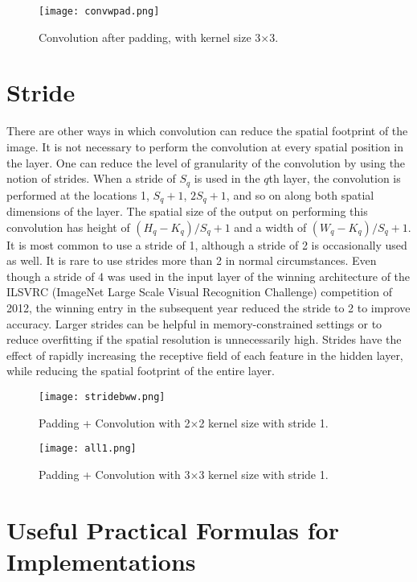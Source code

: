 \documentclass[11pt]{article}
\begin{document}
\begin{figure}[H]
\centering
\texttt{[image: convwpad.png]}
\caption{Convolution after padding, with kernel size 3$\times$3.}
\label{fig:figure3}
\end{figure}

\section{Stride}
\hspace*{1cm} There are other ways in which convolution can reduce the spatial footprint of the image. It is not necessary to perform the convolution at every spatial position in the layer. One can reduce the level of granularity of the convolution by using the notion of strides. When a stride of $S_q$ is used in the $q$th layer, the convolution is performed at the locations 1, $S_q+1$, $2S_q+1$, and so on along both spatial dimensions of the layer. The spatial size of the output on performing this convolution has height of $(H_q - K_q)/S_q + 1$ and a width of $(W_q - K_q)/S_q + 1$. \\
It is most common to use a stride of 1, although a stride of 2 is occasionally used as well. It is rare to use strides more than 2 in normal circumstances. Even though a stride of 4 was used in the input layer of the winning architecture of the ILSVRC (ImageNet Large Scale Visual Recognition Challenge) competition of 2012, the winning entry in the subsequent year reduced the stride to 2 to improve accuracy. Larger strides can be helpful in memory-constrained settings or to reduce overfitting if the spatial resolution is unnecessarily high. Strides have the effect of rapidly increasing the receptive field of each feature in the hidden layer, while reducing the spatial footprint of the entire layer.
\begin{figure}[H]
\centering
\texttt{[image: stridebww.png]}
\caption{Padding + Convolution with 2$\times$2 kernel size with stride 1.}
\label{fig:figure3}
\end{figure}
\begin{figure}[H]
\centering
\texttt{[image: all1.png]}
\caption{Padding + Convolution with 3$\times$3 kernel size with stride 1.}
\label{fig:figure3}
\end{figure}
\section*{Useful Practical Formulas for Implementations}
\end{document}
